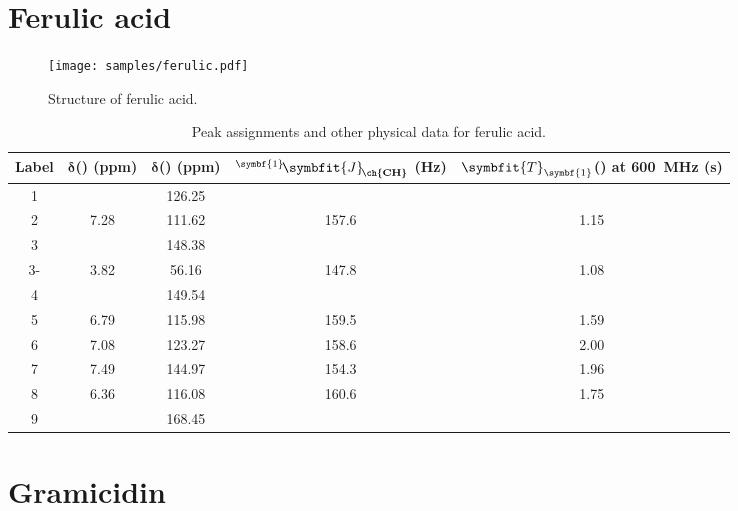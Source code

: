 \clearpage

\section{Ferulic acid}

\begin{figure}[!ht]
    \centering
    \texttt{[image: samples/ferulic.pdf]}%
    \caption[Structure of ferulic acid]{
        Structure of ferulic acid.
    }
    \label{fig:samples_ferulic}
\end{figure}

\begin{table}[!ht] \begin{tabular}{cSSSS}
        \toprule
        \textbf{Label} & {$\symbf{\delta}$\textbf{(\proton{}) (ppm)}} & {$\symbf{\delta}$\textbf{(\carbon{}) (ppm)}} & {${}^{\symbf{1}}\!\symbfit{J}_{\!\textbf{\ch{CH}}}$ \textbf{(Hz)}} & {$\symbfit{T}_{\symbf{1}}$\textbf{(\proton{}) at \qty{600}{MHz} (s)}} \\
                   &      & 126.25 &       &      \\
        2           & 7.28 & 111.62 & 157.6 & 1.15 \\
        3           &      & 148.38 &       &      \\
        3- & 3.82 & 56.16  & 147.8 & 1.08 \\
        4           &      & 149.54 &       &      \\
        5           & 6.79 & 115.98 & 159.5 & 1.59 \\
        6           & 7.08 & 123.27 & 158.6 & 2.00 \\
        7           & 7.49 & 144.97 & 154.3 & 1.96 \\
        8           & 6.36 & 116.08 & 160.6 & 1.75 \\
        9           &      & 168.45 &       &      \\
        \bottomrule
    \end{tabular}
    \caption[Peak assignments for ferulic acid]{
        Peak assignments and other physical data for ferulic acid.
    }
    \label{tbl:ferulic_assignments}
\end{table}

\clearpage

\section{Gramicidin}

